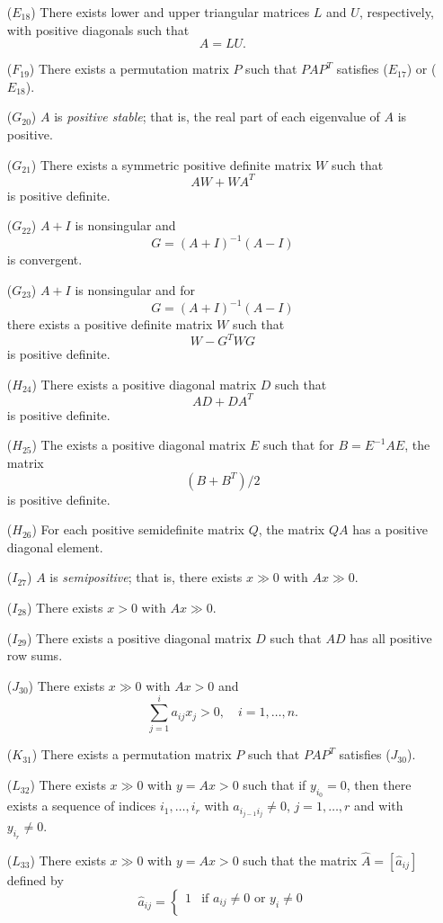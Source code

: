 \documentclass[aspectratio=169]{beamer}
\begin{document}
\begin{frame}
\begin{theorem}
\begin{enumerate}
\item[($E_{18}$)] There exists lower and upper triangular matrices $L$ and $U$, respectively, with positive diagonals such that
\[
A=LU.
\]
\item[($F_{19}$)] There exists a permutation matrix $P$ such that $PAP^T$ satisfies ($E_{17}$) or ($E_{18}$).
\item[($G_{20}$)] $A$ is \emph{positive stable}; that is, the real part of each eigenvalue of $A$ is positive.
\item[($G_{21}$)] There exists a symmetric positive definite matrix $W$ such that
\[
AW+WA^T
\]
is positive definite.
\item[($G_{22}$)] $A+I$ is nonsingular and
\[
G=(A+I)^{-1}(A-I)
\]
is convergent.
\item[($G_{23}$)] $A+I$ is nonsingular and for 
\[
G=(A+I)^{-1}(A-I)
\]
there exists a positive definite matrix $W$ such that
\[
W-G^TWG
\]
is positive definite.
\item[($H_{24}$)] There exists a positive diagonal matrix $D$ such that 
\[
AD+DA^T
\]
is positive definite.
\item[($H_{25}$)] The exists a positive diagonal matrix $E$ such that for $B=E^{-1}AE$, the matrix
\[
(B+B^T)/2
\]
is positive definite.
\item[($H_{26}$)] For each positive semidefinite matrix $Q$, the matrix $QA$ has a positive diagonal element.
\item[($I_{27}$)] $A$ is \emph{semipositive}; that is, there exists $x\gg 0$ with $Ax\gg 0$.
\item[($I_{28}$)] There exists $x>0$ with $Ax\gg 0$.
\item[($I_{29}$)] There exists a positive diagonal matrix $D$ such that $AD$ has all positive row sums.
\item[($J_{30}$)] There exists $x\gg 0$ with $Ax>0$ and
\[
\sum_{j=1}^i a_{ij}x_j>0,\quad i=1,\ldots,n.
\]
\item[($K_{31}$)] There exists a permutation matrix $P$ such that $PAP^T$ satisfies ($J_{30}$).
\item[($L_{32}$)] There exists $x\gg 0$ with $y=Ax>0$ such that if $y_{i_0}=0$, then there exists a sequence of indices $i_1,\ldots,i_r$ with $a_{i_{j-1}i_j}\neq 0$, $j=1,\ldots,r$ and with $y_{i_r}\neq 0$.
\item[($L_{33}$)] There exists $x\gg 0$ with $y=Ax>0$ such that the matrix $\hat A=[\hat a_{ij}]$ defined by
\[
\hat a_{ij} =
\begin{cases}
1 & \textrm{if } a_{ij}\neq 0\textrm{ or }y_i\neq 0 \\

\end{cases}\]
\end{enumerate}
\end{theorem}
\end{frame}
\end{document}
